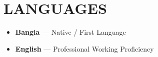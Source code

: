 \documentclass[10pt, a4paper]{article}
\begin{document}
\section{LANGUAGES}
\begin{itemize}[leftmargin=0.18in, label=\textbullet, itemsep=1pt, topsep=2pt]
  \small
  \item \textbf{Bangla} --- Native / First Language
  \item \textbf{English} --- Professional Working Proficiency
\end{itemize}
\end{document}
